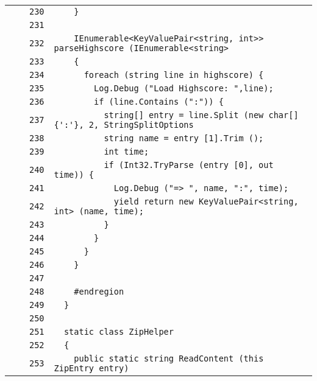 \documentclass[a4paper,10pt]{article}
\begin{document}
\begin{longtable}[l]{lrrl}
\cellcolor{gray} &  & \verb~230~ & \verb~    }~\\
\cellcolor{gray} &  & \verb~231~ & \verb~~\\
\cellcolor{gray} &  & \verb~232~ & \verb~    IEnumerable<KeyValuePair<string, int>> parseHighscore (IEnumerable<string>~\\
\cellcolor{gray} &  & \verb~233~ & \verb~    {~\\
\cellcolor{gray} &  & \verb~234~ & \verb~      foreach (string line in highscore) {~\\
\cellcolor{gray} &  & \verb~235~ & \verb~        Log.Debug ("Load Highscore: ",line);~\\
\cellcolor{gray} &  & \verb~236~ & \verb~        if (line.Contains (":")) {~\\
\cellcolor{gray} &  & \verb~237~ & \verb~          string[] entry = line.Split (new char[] {':'}, 2, StringSplitOptions~\\
\cellcolor{gray} &  & \verb~238~ & \verb~          string name = entry [1].Trim ();~\\
\cellcolor{gray} &  & \verb~239~ & \verb~          int time;~\\
\cellcolor{gray} &  & \verb~240~ & \verb~          if (Int32.TryParse (entry [0], out time)) {~\\
\cellcolor{gray} &  & \verb~241~ & \verb~            Log.Debug ("=> ", name, ":", time);~\\
\cellcolor{gray} &  & \verb~242~ & \verb~            yield return new KeyValuePair<string, int> (name, time);~\\
\cellcolor{gray} &  & \verb~243~ & \verb~          }~\\
\cellcolor{gray} &  & \verb~244~ & \verb~        }~\\
\cellcolor{gray} &  & \verb~245~ & \verb~      }~\\
\cellcolor{gray} &  & \verb~246~ & \verb~    }~\\
\cellcolor{gray} &  & \verb~247~ & \verb~~\\
\cellcolor{gray} &  & \verb~248~ & \verb~    #endregion~\\
\cellcolor{gray} &  & \verb~249~ & \verb~  }~\\
\cellcolor{gray} &  & \verb~250~ & \verb~~\\
\cellcolor{gray} &  & \verb~251~ & \verb~  static class ZipHelper~\\
\cellcolor{gray} &  & \verb~252~ & \verb~  {~\\
\cellcolor{gray} &  & \verb~253~ & \verb~    public static string ReadContent (this ZipEntry entry)~\\

\end{longtable}
\end{document}
